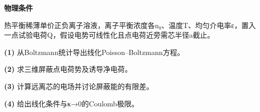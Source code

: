 \textbf{物理条件}\par 热平衡稀薄单价正负离子溶液，离子平衡浓度各n₀、温度T、均匀介电率ε，置入一点试验电荷Q，假设电势可线性化且点电荷近旁需芯半径a截止。
\par\noindent\textbf{(1)} 从Boltzmann统计导出线化Poisson–Boltzmann方程。
\par\noindent\textbf{(2)} 求三维屏蔽点电荷势及诱导净电荷。
\par\noindent\textbf{(3)} 计算远离芯的电场并讨论屏蔽能的有限差。
\par\noindent\textbf{(4)} 给出线化条件与κ→0的Coulomb极限。
